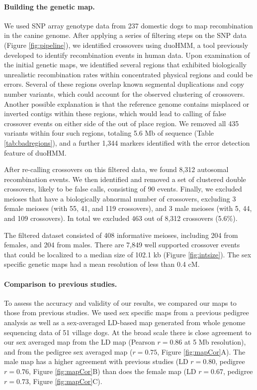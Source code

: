 \paragraph{Building the genetic map.}
We used SNP array genotype data from 237 domestic dogs to map recombination in the canine genome. 
After applying a series of filtering steps on the SNP data (Figure \ref{fig:pipeline}),
we identified crossovers using duoHMM, a tool previously developed to identify recombination events in human data\cite{OConnell2014}.
Upon examination of the initial genetic maps, we identified several regions that exhibited biologically unrealistic recombination rates within concentrated physical regions and could be errors.
Several of these regions overlap known segmental duplications and copy number variants\cite{Nicholas2009,Chen2009}, which could account for the observed clustering of crossovers.
Another possible explanation is that the reference genome contains misplaced or inverted contigs within these regions, which would lead to calling of false crossover events on either side of the out of place region.
We removed all 435 variants within four such regions, totaling 5.6 Mb of sequence (Table \ref{tab:badregions}), and
a further 1,344 markers identified with the error detection feature of duoHMM. 

After re-calling crossovers on this filtered data, we found 8,312 autosomal recombination events.
We then identified and removed a set of clustered double crossovers, likely to be false calls, consisting of 90 events. 
Finally, we excluded meioses that have a biologically abnormal number of crossovers, excluding 3 female meioses (with 55, 41, and 119 crossovers), and 3 male meioses (with 5, 44, and 109 crossovers).
In total we excluded 463 out of 8,312 crossovers (5.6\%).

The filtered dataset consisted of 408 informative meioses, including 204 from females, and 204 from males.
There are 7,849 well supported crossover events that could be localized to a median size of 102.1 kb (Figure \ref{fig:intsize}).
The sex specific genetic maps had a mean resolution of less than 0.4 cM. 

\paragraph{Comparison to previous studies.}
To assess the accuracy and validity of our results, we compared our maps to those from previous studies.
We used sex specific maps from a previous pedigree analysis\cite{Wong2010} as well as a sex-averaged LD-based map generated from whole genome sequencing data of 51 village dogs\cite{Auton2013}.
At the broad scale there is close agreement to our sex averaged map from the LD map (Pearson $r=0.86$ at 5 Mb resolution), and from the pedigree sex averaged map ($r=0.75$, Figure \ref{fig:mapCor}A).
The male map has a higher agreement with previous studies (LD $r=0.80$, pedigree $r=0.76$, Figure \ref{fig:mapCor}B) than does the female map (LD $r=0.67$, pedigree $r=0.73$, Figure \ref{fig:mapCor}C).

